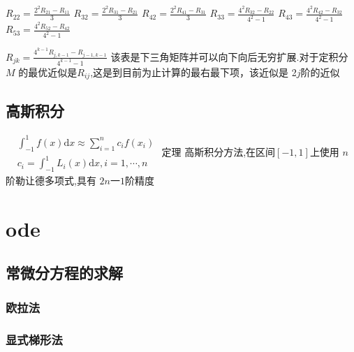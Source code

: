 \documentclass[UTF8,5pt,a4paper]{ctexart} %
\begin{document}
\begin{multicols}{4}
            

$R_{22}=\frac{2^2R_{21}-R_{11}}3$
$R_{32}=\frac{2^2R_{31}-R_{21}}3$
$R_{42}=\frac{2^2R_{41}-R_{31}}3$
$R_{33}=\frac{4^2R_{32}-R_{22}}{4^2-1}$
$R_{43}=\frac{4^2R_{42}-R_{32}}{4^2-1}$
$R_{53}=\frac{4^2R_{52}-R_{42}}{4^2-1}$

$R_{jk}=\frac{4^{k-1}R_{j,k-1}-R_{j-1,k-1}}{4^{k-1}-1}$
该表是下三角矩阵并可以向下向后无穷扩展.对于定积分 $M$ 的最优近似是$R_{ij}$,这是到目前为止计算的最右最下项，该近似是 2$j$阶的近似
\subsection{高斯积分}
$\begin{aligned}
    &\int_{-1}^{1}f\left(x\right)\mathrm{d}x\approx\sum_{i=1}^{n}c_{i}f\left(x_{i}\right)\\
    &c_{i}=\int_{-1}^{1}L_{i}\left(x\right)\mathrm{d}x,i=1,\cdots,n\end{aligned}$
定理  高斯积分方法,在区间$[-1,1]$上使用 $n$ 阶勒让德多项式,具有 $2n一1 $阶精度

\section{ode}
\subsection{常微分方程的求解}
\subsubsection{欧拉法}


\subsubsection{显式梯形法}


\end{multicols}
\end{document}
